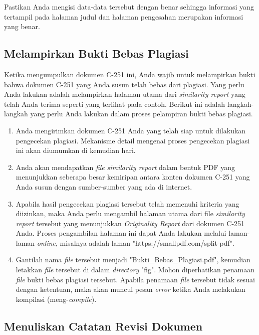         \noindent Pastikan Anda mengisi data-data tersebut dengan benar sehingga informasi yang tertampil pada halaman judul dan halaman pengesahan merupakan informasi yang benar.
    
    \subsection{Melampirkan Bukti Bebas Plagiasi}
    \label{subsec:Melampirkan_Bukti_Bebas_Plagiasi}
    
        Ketika mengumpulkan dokumen C-251 ini, Anda \uline{wajib} untuk melampirkan bukti bahwa dokumen C-251 yang Anda susun telah bebas dari plagiasi. Yang perlu Anda lakukan adalah melampirkan halaman utama dari \textit{similarity report} yang telah Anda terima seperti yang terlihat pada contoh. Berikut ini adalah langkah-langkah yang perlu Anda lakukan dalam proses pelampiran bukti bebas plagiasi.
        
        \begin{enumerate}
            \item Anda mengirimkan dokumen C-251 Anda yang telah siap untuk dilakukan pengecekan plagiasi. Mekanisme detail mengenai proses pengecekan plagiasi ini akan diumumkan di kemudian hari.
            \item Anda akan mendapatkan \textit{file} \textit{similarity report} dalam bentuk PDF yang menunjukkan seberapa besar kemiripan antara konten dokumen C-251 yang Anda susun dengan sumber-sumber yang ada di internet.
            \item Apabila hasil pengecekan plagiasi tersebut telah memenuhi kriteria yang diizinkan, maka Anda perlu mengambil halaman utama dari file \textit{similarity report} tersebut yang menunjukkan \textit{Originality Report} dari dokumen C-251 Anda. Proses pengambilan halaman ini dapat Anda lakukan melalui laman-laman \textit{online}, misalnya adalah laman "https://smallpdf.com/split-pdf".
            \item Gantilah nama \textit{file} tersebut menjadi "Bukti\_Bebas\_Plagiasi.pdf", kemudian letakkan \textit{file} tersebut di dalam \textit{directory} "fig". Mohon diperhatikan penamaan \textit{file} bukti bebas plagiasi tersebut. Apabila penamaan \textit{file} tersebut tidak sesuai dengan ketentuan, maka akan muncul pesan \textit{error} ketika Anda melakukan kompilasi (meng-\textit{compile}).
        \end{enumerate}
        
    \subsection{Menuliskan Catatan Revisi Dokumen}
    \label{subsec:Menuliskan_Catatan_Revisi_Dokumen}
    
